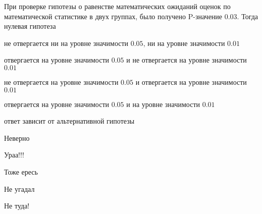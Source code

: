 
\begin{question}
При проверке гипотезы о равенстве математических ожиданий оценок по
математической статистике в двух группах, было получено P-значение 0.03.
Тогда нулевая гипотеза
\begin{answerlist}
  \item не отвергается ни на уровне значимости \(0.05\), ни на уровне значимости
\(0.01\)
  \item отвергается на уровне значимости \(0.05\) и не отвергается на уровне
значимости \(0.01\)
  \item не отвергается на уровне значимости \(0.05\) и отвергается на уровне
значимости \(0.01\)
  \item отвергается на уровне значимости \(0.05\) и на уровне значимости
\(0.01\)
  \item ответ зависит от альтернативной гипотезы
\end{answerlist}
\end{question}

\begin{solution}
\begin{answerlist}
  \item Неверно
  \item Ураа!!!
  \item Тоже ересь
  \item Не угадал
  \item Не туда!
\end{answerlist}
\end{solution}

